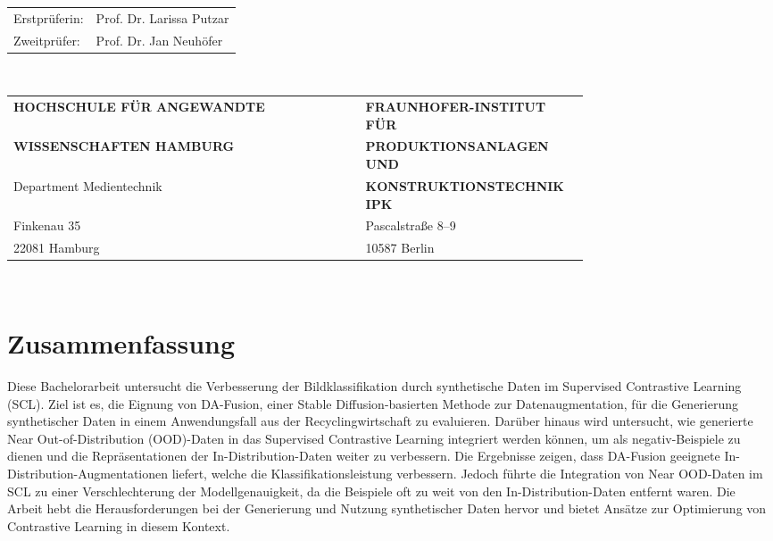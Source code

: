 \begin{titlepage}
  \vspace{3cm}

  \hspace*{37mm}
  \begin{minipage}{0.5\linewidth}
    \begin{tabular}{@{}ll}
      Erstprüferin: & Prof. Dr. Larissa Putzar\\[-.3mm]
      Zweitprüfer: & Prof. Dr. Jan Neuhöfer \\
    \end{tabular}\\
	
    \vspace{5mm}
	
	\begin{tabular}{@{} p{0.75\linewidth} ll} %
    \textbf{HOCHSCHULE FÜR ANGEWANDTE} & \textbf{FRAUNHOFER-INSTITUT FÜR}\\
    \textbf{WISSENSCHAFTEN HAMBURG} & \textbf{PRODUKTIONSANLAGEN UND}\\
    Department Medientechnik & \textbf{KONSTRUKTIONSTECHNIK IPK}\\
    Finkenau 35 & Pascalstraße 8–9\\
    22081 Hamburg & 10587 Berlin
	\end{tabular}\\
  \end{minipage}
\end{titlepage}
\restoregeometry

\thispagestyle{empty}

\section*{Zusammenfassung}

Diese Bachelorarbeit untersucht die Verbesserung der Bildklassifikation durch synthetische Daten im Supervised Contrastive Learning (SCL). Ziel ist es, die Eignung von DA-Fusion, einer Stable Diffusion-basierten Methode zur Datenaugmentation, für die Generierung synthetischer Daten in einem Anwendungsfall aus der Recyclingwirtschaft zu evaluieren. Darüber hinaus wird untersucht, wie generierte Near Out-of-Distribution (OOD)-Daten in das Supervised Contrastive Learning integriert werden können, um als negativ-Beispiele zu dienen und die Repräsentationen der In-Distribution-Daten weiter zu verbessern. Die Ergebnisse zeigen, dass DA-Fusion geeignete In-Distribution-Augmentationen liefert, welche die Klassifikationsleistung verbessern. Jedoch führte die Integration von Near OOD-Daten im SCL zu einer Verschlechterung der Modellgenauigkeit, da die Beispiele oft zu weit von den In-Distribution-Daten entfernt waren. Die Arbeit hebt die Herausforderungen bei der Generierung und Nutzung synthetischer Daten hervor und bietet Ansätze zur Optimierung von Contrastive Learning in diesem Kontext.

